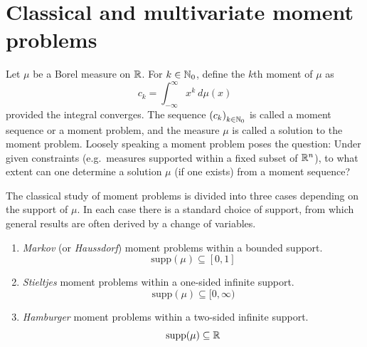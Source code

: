   

\section{Classical and multivariate moment problems} \label{sec:momentproblem}
Let $\mu$ be a Borel measure on $\mathbb{R}$. For $k \in \mathbb{N}_0$, define the $k$th moment of $\mu$ as
\[
  c_k = \int_{-\infty}^\infty x^k ~d\mu(x)
\]
provided the integral converges. The sequence ${(c_k)}_{k \in \mathbb{N}_0}$ is called a moment sequence or a moment problem, and the measure $\mu$ is called a solution to the moment problem. Loosely speaking a moment problem poses the question: Under given constraints (e.g.\ measures supported within a fixed subset of $\mathbb{R}^n$), to what extent can one determine a solution $\mu$ (if one exists) from a moment sequence? 

The classical study of moment problems is divided into three cases depending on the support of $\mu$. In each case there is a standard choice of support, from which general results are often derived by a change of variables.
\begin{enumerate}[label=]
  \item \emph{Markov} (or \emph{Haussdorf}) moment problems within a bounded support.
  \[
    \text{supp}(\mu) \subseteq [0,1]
  \]
  \item \emph{Stieltjes} moment problems within a one-sided infinite support. 
  \[
    \text{supp}(\mu) \subseteq [0,\infty)
  \]
  \item \emph{Hamburger} moment problems within a two-sided infinite support.
  \[
    \text{supp}(\mu) \subseteq \mathbb{R}
  \]
\end{enumerate}


